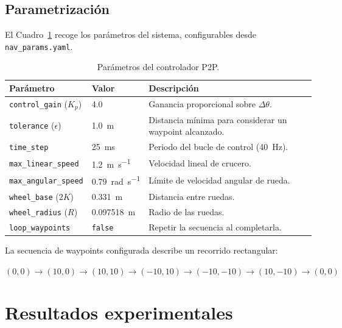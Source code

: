 \documentclass[12pt]{article}
\begin{document}
\subsection{Parametrizaci\'{o}n}
El Cuadro~\ref{tab:parametros} recoge los par\'{a}metros del sistema, configurables desde \texttt{nav\_params.yaml}.

\begin{table}[H]
  \centering
  \caption{Par\'{a}metros del controlador P2P.}
  \label{tab:parametros}
  \begin{tabularx}{0.98\linewidth}{l l X}
    \toprule
    \textbf{Par\'{a}metro} & \textbf{Valor} & \textbf{Descripci\'{o}n} \\
    \midrule
    \texttt{control\_gain} ($K_p$) & 4.0        & Ganancia proporcional sobre $\Delta\theta$. \\
    \texttt{tolerance} ($\epsilon$) & \SI{1.0}{\meter} & Distancia m\'{i}nima para considerar un waypoint alcanzado. \\
    \texttt{time\_step}           & \SI{25}{\milli\second} & Periodo del bucle de control (40~Hz). \\
    \texttt{max\_linear\_speed}   & \SI{1.2}{\meter\per\second} & Velocidad lineal de crucero. \\
    \texttt{max\_angular\_speed}  & \SI{0.79}{\radian\per\second} & L\'{i}mite de velocidad angular de rueda. \\
    \texttt{wheel\_base} ($2K$)   & \SI{0.331}{\meter} & Distancia entre ruedas. \\
    \texttt{wheel\_radius} ($R$)  & \SI{0.097518}{\meter} & Radio de las ruedas. \\
    \texttt{loop\_waypoints}      & \texttt{false} & Repetir la secuencia al completarla. \\
    \bottomrule
  \end{tabularx}
\end{table}

La secuencia de waypoints configurada describe un recorrido rectangular:

\begin{center}
$(0,0) \to (10,0) \to (10,10) \to (-10,10) \to (-10,-10) \to (10,-10) \to (0,0)$
\end{center}


\section{Resultados experimentales}
\end{document}
